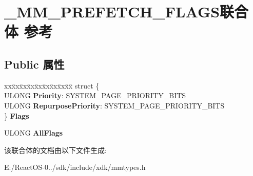 \hypertarget{union___m_m___p_r_e_f_e_t_c_h___f_l_a_g_s}{}\section{\+\_\+\+M\+M\+\_\+\+P\+R\+E\+F\+E\+T\+C\+H\+\_\+\+F\+L\+A\+G\+S联合体 参考}
\label{union___m_m___p_r_e_f_e_t_c_h___f_l_a_g_s}
\subsection*{Public 属性}
\begin{DoxyCompactItemize}
\item 
\mbox{\label{union___m_m___p_r_e_f_e_t_c_h___f_l_a_g_s_a1fffca2ddf9e96c6997e1a7e68308e11}} 
\begin{tabbing}
xx\=xx\=xx\=xx\=xx\=xx\=xx\=xx\=xx\=\kill
struct \{\\
\>ULONG {\bfseries Priority}: SYSTEM\_PAGE\_PRIORITY\_BITS\\
\>ULONG {\bfseries RepurposePriority}: SYSTEM\_PAGE\_PRIORITY\_BITS\\
\} {\bfseries Flags}\\

\end{tabbing}\item 
\mbox{\label{union___m_m___p_r_e_f_e_t_c_h___f_l_a_g_s_a5ebef3e268f840c8659df7fc261bea94}} 
U\+L\+O\+NG {\bfseries All\+Flags}
\end{DoxyCompactItemize}


该联合体的文档由以下文件生成\+:\begin{DoxyCompactItemize}
\item 
E\+:/\+React\+O\+S-\/0../sdk/include/xdk/mmtypes.\+h\end{DoxyCompactItemize}
